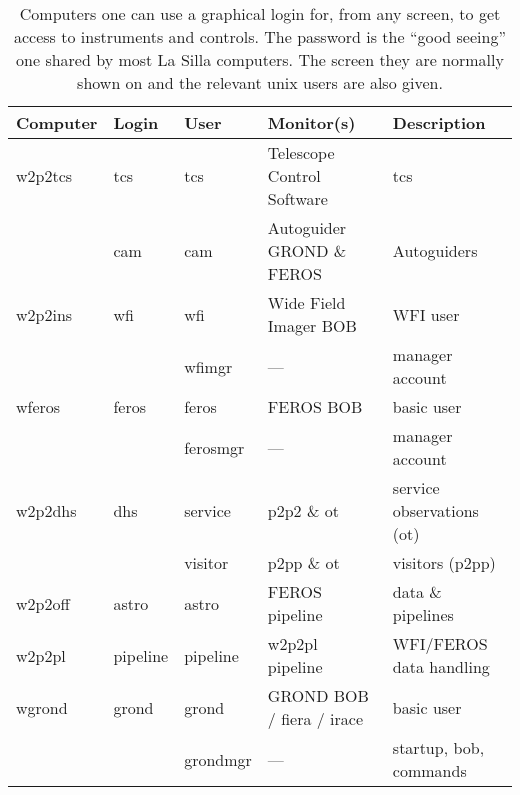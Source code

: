 \documentclass[11pt,fleqn]{book}
\begin{document}
\begin{table}
    \caption[Main workstations and users]{Computers one can use a graphical login for, from any screen, to get access to instruments and controls.  The password is the ``good seeing'' one shared by most  La Silla computers. The screen they are normally shown on and the relevant unix users are also given.  }
\label{fig:computers}
\centering
\begin{tabular}{lllll}
\hline
Computer         & Login    & User     & Monitor(s)                 & Description\\\hline\hline
\gls{w2p2tcs} & tcs      & tcs      & Telescope Control Software & \gls{tcs}\\
              & cam      & cam      & Autoguider GROND \& FEROS  & Autoguiders\\
\gls{w2p2ins} & wfi      & wfi      & Wide Field Imager BOB      & WFI user\\
              &          & wfimgr   & ---                        & manager account\\
\gls{wferos}  & feros    & feros    & FEROS BOB                  & basic user\\
              &          & ferosmgr & ---                        & manager account\\
\gls{w2p2dhs} & dhs      & service  & p2p2 \& ot                 & service observations (ot)\\
              &          & visitor  & p2pp \& ot                 & visitors (p2pp)\\
\gls{w2p2off} & astro    & astro    & FEROS pipeline             & data \& pipelines\\
\gls{w2p2pl}  & pipeline & pipeline & w2p2pl pipeline            & WFI/FEROS data handling\\       
\gls{wgrond}  & grond    & grond    & GROND BOB / \gls{fiera} / \gls{irace}  & basic user\\
              &          & grondmgr & ---                        & startup, \gls{bob}, commands\\
\hline
\end{tabular}
\end{table}
\end{document}
